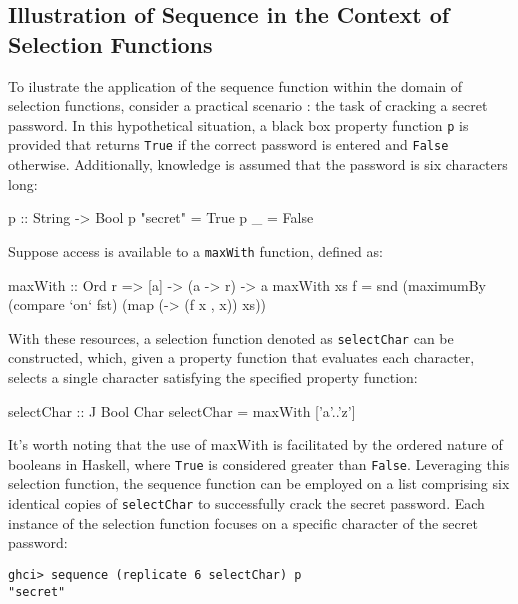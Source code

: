 \documentclass[runningheads]{llncs}
\begin{document}
\subsection{Illustration of Sequence in the Context of Selection
Functions}\label{illustration-of-sequence-in-the-context-of-selection-functions}

To ilustrate the application of the sequence function within the domain
of selection functions, consider a practical scenario
\cite{hartmann2022algorithm}: the task of cracking a secret password. In
this hypothetical situation, a black box property function \texttt{p} is
provided that returns \texttt{True} if the correct password is entered
and \texttt{False} otherwise. Additionally, knowledge is assumed that
the password is six characters long:

\begin{code}
p :: String -> Bool
p "secret" = True
p _        = False
\end{code}

Suppose access is available to a \texttt{maxWith} function, defined as:

\begin{code}
maxWith :: Ord r => [a] -> (a -> r) -> a
maxWith xs f = snd (maximumBy (compare `on` fst) (map (\x -> (f x , x)) xs))
\end{code}

With these resources, a selection function denoted as
\texttt{selectChar} can be constructed, which, given a property function
that evaluates each character, selects a single character satisfying the
specified property function:

\begin{code}
selectChar :: J Bool Char
selectChar = maxWith ['a'..'z']
\end{code}

It's worth noting that the use of maxWith is facilitated by the ordered
nature of booleans in Haskell, where \texttt{True} is considered greater
than \texttt{False}. Leveraging this selection function, the sequence
function can be employed on a list comprising six identical copies of
\texttt{selectChar} to successfully crack the secret password. Each
instance of the selection function focuses on a specific character of
the secret password:

\begin{verbatim}
ghci> sequence (replicate 6 selectChar) p
"secret"
\end{verbatim}
\end{document}
